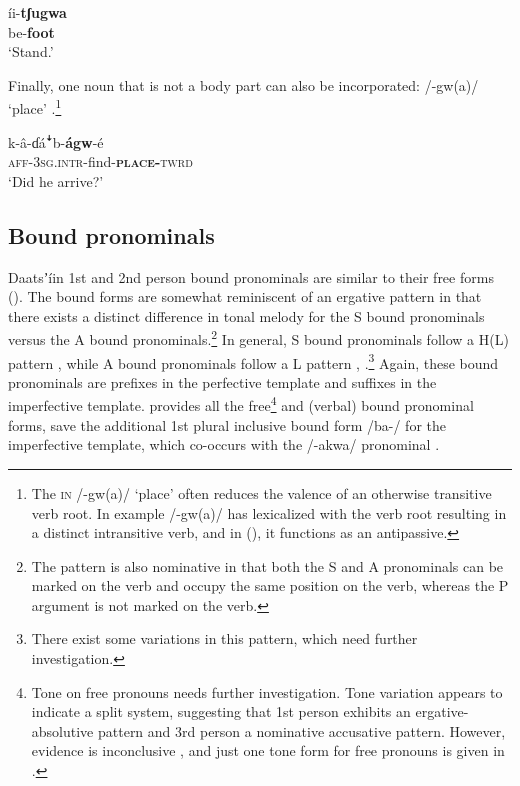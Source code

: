 \documentclass[output=paper]{langsci/langscibook}
\begin{document}
\ea\label{ex:ahlandc:14}
\gll
íi-\textbf{tʃugwa} \\
be{}-\textbf{foot} \\
\glt
‘Stand.’
\z

Finally, one noun that is not a body part can also be incorporated: /-gw(a)/ ‘place' .\footnote{The \textsc{in }/-gw(a)/ ‘place’ often reduces the valence of an otherwise transitive verb root. In example  /-gw(a)/ has lexicalized with the verb root resulting in a distinct intransitive verb, and in  (), it functions as an antipassive.}

\ea\label{ex:ahlandc:15}
\gll
k-â-ɗá\textsf{ꜜ}b-\textbf{ágw}{}-é \\
\textsc{aff-3sg.intr}-find-\textbf{\textsc{place-}}\textsc{twrd} \\
\glt
‘Did he arrive?’
\z


\subsection{Bound pronominals}\label{sec:ahlandc:4.2}

Daatsʼíin 1st and 2nd person bound pronominals are similar to their free forms (). The bound forms are somewhat reminiscent of an ergative pattern in that there exists a distinct difference in tonal melody for the S bound pronominals versus the A bound pronominals.\footnote{The pattern is also nominative in that both the S and A pronominals can be marked on the verb and occupy the same position on the verb, whereas the P argument is not marked on the verb.} In general, S bound pronominals follow a H(L) pattern ,  while A bound pronominals follow a L pattern , .\footnote{There exist some variations in this pattern, which need further investigation.} Again, these bound pronominals are prefixes in the perfective template and suffixes in the imperfective template.  provides all the free\footnote{Tone on free pronouns needs further investigation. Tone variation appears to indicate a split system, suggesting that 1st person exhibits an ergative-absolutive pattern and 3rd person a nominative accusative pattern. However, evidence is inconclusive \citep{Kelly2014}, and just one tone form for free pronouns is given in .} and (verbal) bound pronominal forms, save the additional 1st plural inclusive bound form /ba-/ for the imperfective template, which co-occurs with the /-akwa/ pronominal .
\end{document}
